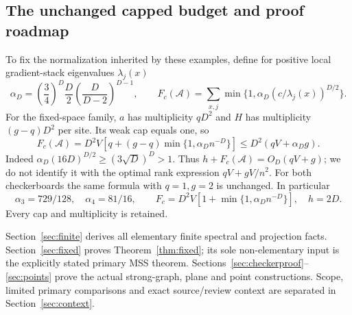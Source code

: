 \subsection{The unchanged capped budget and proof roadmap}
To fix the normalization inherited by these examples, define for positive
local gradient-stack eigenvalues $\lambda_j(x)$
\begin{equation}\label{eq:cap}
 \alpha_D=\left(\frac34\right)^D\frac D2
       \left(\frac D{D-2}\right)^{D-1},\qquad
 F_c(\mathcal A)=\sum_{x,j}\min\{1,\alpha_D(c/\lambda_j(x))^{D/2}\}.
\end{equation}
For the fixed-space family, $a$ has multiplicity $qD^2$ and $H$ has
multiplicity $(g-q)D^2$ per site. Its weak cap equals one, so
\begin{equation}\label{eq:fixedcap}
 F_c(\mathcal A)=D^2V[q+(g-q)\min\{1,\alpha_Dn^{-D}\}]
 \leq D^2(qV+\alpha_Dg).
\end{equation}
Indeed $\alpha_D(16D)^{D/2}\geq(3\sqrt D)^D>1$.
Thus $h+F_c(\mathcal A)=O_D(qV+g)$; we do not identify it with the optimal
rank expression $qV+gV/n^2$. For both checkerboards the same formula with
$q=1,g=2$ is unchanged. In particular
\[
 \alpha_3=729/128,\quad \alpha_4=81/16,\qquad
 F_c=D^2V[1+\min\{1,\alpha_Dn^{-D}\}],\quad h=2D.
\]
Every cap and multiplicity is retained.

Section~\ref{sec:finite} derives all elementary finite spectral and projection
facts. Section~\ref{sec:fixed} proves Theorem~\ref{thm:fixed}; its sole
non-elementary input is the explicitly stated primary MSS theorem.
Sections~\ref{sec:checkerproof}--\ref{sec:points} prove the actual strong-graph,
plane and point constructions. Scope, limited primary comparisons and exact
source/review context are separated in Section~\ref{sec:context}.
